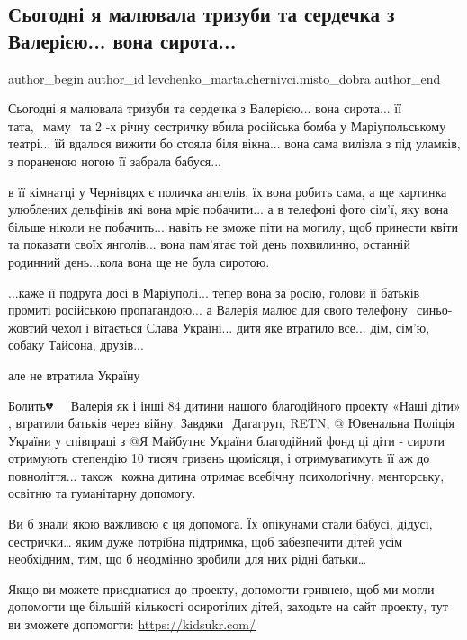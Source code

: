  
 
 
 
 

\subsection{Сьогодні я малювала тризуби та сердечка з Валерією... вона сирота...}
\label{sec:12_01_2023.fb.levchenko_marta.chernivci.misto_dobra.1.sogodn__ya_malyuvala}

\ifcmt
 author_begin
   author_id levchenko_marta.chernivci.misto_dobra
 author_end
\fi

Сьогодні я малювала тризуби та сердечка з Валерією... вона сирота... її
тата,⠀маму⠀та 2 -х річну сестричку вбила російська бомба у Маріупольському
театрі... їй вдалося вижити бо стояла біля вікна... вона сама вилізла з під
уламків, з пораненою ногою її забрала бабуся... 

в її кімнатці у Чернівцях є поличка ангелів, їх вона робить сама, а ще
картинка улюблених дельфінів які вона мріє побачити... а в телефоні фото сім'ї,
яку вона більше ніколи не побачить... навіть не зможе піти на могилу, щоб
принести квіти та показати своїх янголів... вона пам'ятає той день похвилинно,
останній родинний день...кола вона ще не була сиротою. ⁣⁣⠀

...каже її подруга досі в Маріуполі... тепер вона за росію, голови її батьків
промиті російською пропагандою... а Валерія малює для свого
телефону⠀синьо-жовтий чехол і вітається Слава Україні... дитя яке втратило
все... дім, сім'ю, собаку Тайсона, друзів... ⁣⁣⠀

але не втратила Україну💙💛🇺🇦 ⁣⁣⠀

Болить💔
⁣⁣⠀
Валерія як і інші 84 дитини нашого благодійного проекту «Наші діти» , втратили
батьків через війну. Завдяки⠀Датагруп, RETN, @ Ювенальна Поліція України у
співпраці з @Я Майбутнє України благодійний фонд ці діти - сироти отримують
степендію 10 тисяч гривень щомісяця, і отримуватимуть її аж до повноліття...
також⠀кожна дитина отримає всебічну психологічну, менторську, освітню та
гуманітарну допомогу. 

 Ви б знали якою важливою є ця допомога. Їх опікунами стали бабусі, дідусі,
 сестрички… яким дуже потрібна підтримка, щоб забезпечити дітей усім
 необхідним, тим, що б неодмінно зробили для них рідні батьки… ⁣⁣⠀

Якщо ви можете приєднатися до проекту, допомогти гривнею, щоб ми могли
допомогти  ще більшій кількості осиротілих  дітей, заходьте на сайт проекту,
тут ви зможете допомогти: ⁣\url{https://kidsukr.com/}
